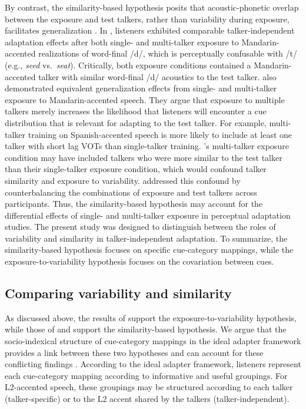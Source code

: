 \documentclass[preprint, 3p, authoryear]{elsarticle} %
\begin{document}
By contrast, the similarity-based hypothesis posits that acoustic-phonetic overlap between the exposure and test talkers, rather than variability during exposure, facilitates generalization \citep{xie2021}.
In \citet{xie2017similarity}, listeners exhibited comparable talker-independent adaptation effects after both single- and multi-talker exposure to Mandarin-accented realizations of word-final /d/, which is perceptually confusable with /t/ (e.g., \emph{seed} vs.~\emph{seat}).
Critically, both exposure conditions contained a Mandarin-accented talker with similar word-final /d/ acoustics to the test talker.
\citet{xie2021} also demonstrated equivalent generalization effects from single- and multi-talker exposure to Mandarin-accented speech.
They argue that exposure to multiple talkers merely increases the likelihood that listeners will encounter a cue distribution that is relevant for adapting to the test talker.
For example, multi-talker training on Spanish-accented speech is more likely to include at least one talker with short lag VOTs than single-talker training.
\citet{bradlow2008}'s multi-talker exposure condition may have included talkers who were more similar to the test talker than their single-talker exposure condition, which would confound talker similarity and exposure to variability.
\citet{xie2021} addressed this confound by counterbalancing the combinations of exposure and test talkers across participants.
Thus, the similarity-based hypothesis may account for the differential effects of single- and multi-talker exposure in perceptual adaptation studies.
The present study was designed to distinguish between the roles of variability and similarity in talker-independent adaptation.
To summarize, the similarity-based hypothesis focuses on specific cue-category mappings, while the exposure-to-variability hypothesis focuses on the covariation between cues.

\hypertarget{intro-gen}{%
\subsection{Comparing variability and similarity}\label{intro-gen}}

As discussed above, the results of \citet{bradlow2008} support the exposure-to-variability hypothesis, while those of \citet{xie2017similarity} and \citet{xie2021} support the similarity-based hypothesis.
We argue that the socio-indexical structure of cue-category mappings in the ideal adapter framework provides a link between these two hypotheses and can account for these conflicting findings \citep{kleinschmidt2019}.
According to the ideal adapter framework, listeners represent each cue-category mapping according to informative and useful groupings.
For L2-accented speech, these groupings may be structured according to each talker (talker-specific) or to the L2 accent shared by the talkers (talker-independent).
\end{document}
